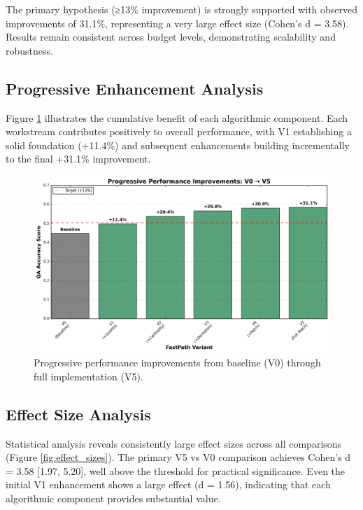 \documentclass[conference]{IEEEtran}
\begin{document}
The primary hypothesis (≥13\% improvement) is strongly supported with observed improvements of 31.1\%, representing a very large effect size (Cohen's d = 3.58). Results remain consistent across budget levels, demonstrating scalability and robustness.

\subsection{Progressive Enhancement Analysis}

Figure \ref{fig:performance_comparison} illustrates the cumulative benefit of each algorithmic component. Each workstream contributes positively to overall performance, with V1 establishing a solid foundation (+11.4\%) and subsequent enhancements building incrementally to the final +31.1\% improvement.

\begin{figure}[t]
\centering
\includegraphics[width=\columnwidth]{figures/performance_comparison.png}
\caption{Progressive performance improvements from baseline (V0) through full implementation (V5).}
\label{fig:performance_comparison}
\end{figure}

\subsection{Effect Size Analysis}

Statistical analysis reveals consistently large effect sizes across all comparisons (Figure \ref{fig:effect_sizes}). The primary V5 vs V0 comparison achieves Cohen's d = 3.58 [1.97, 5.20], well above the threshold for practical significance. Even the initial V1 enhancement shows a large effect (d = 1.56), indicating that each algorithmic component provides substantial value.
\end{document}
